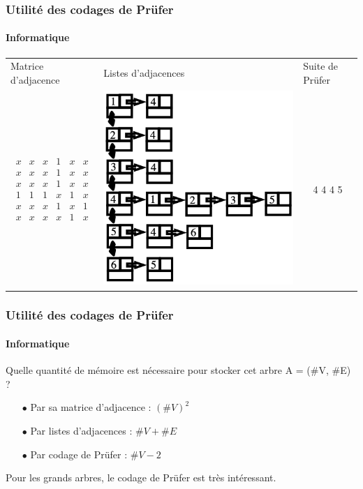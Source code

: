 \documentclass[11pt]{beamer}
\begin{document}
\begin{frame}
\frametitle{Utilité des codages de Prüfer}
\framesubtitle{Informatique}

\begin{table}[]
\centering
\begin{tabular}{l|l|l}
Matrice d'adjacence   & Listes d'adjacences   & Suite de Prüfer      \\
\multicolumn{1}{c|}{$\begin{array}{cccccc}
x & x & x & 1 & x & x \\ 
x & x & x & 1 & x & x \\ 
x & x & x & 1 & x & x \\ 
1 & 1 & 1 & x & 1 & x \\ 
x & x & x & 1 & x & 1 \\ 
x & x & x & x & 1 & x
\end{array}$ } & \multicolumn{1}{c|}{\includegraphics[scale=0.30]{listesAdj.png}} & \multicolumn{1}{c}{4 4 4 5}
\end{tabular}
\end{table}
\end{frame}

\begin{frame}
\frametitle{Utilité des codages de Prüfer}
\framesubtitle{Informatique}

Quelle quantité de mémoire est nécessaire pour stocker cet arbre A = ($\#$V, $\#$E) ?
\vspace{0.3cm}
\begin{enumerate}
\item[$\bullet$]Par sa matrice d'adjacence : $(\# V)^2$
\item[$\bullet$]Par listes d'adjacences : $\# V + \# E$
\item[$\bullet$]Par codage de Prüfer : $\# V - 2$
\end{enumerate}
\vspace{1cm}
Pour les grands arbres, le codage de Prüfer est très intéressant.
\end{frame}
\end{document}
